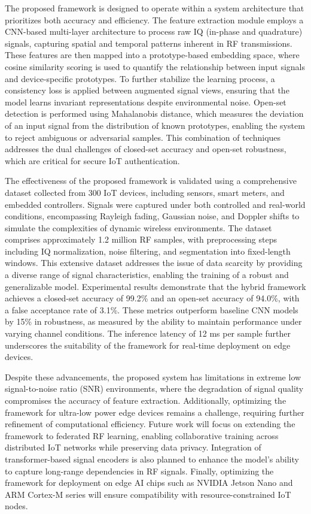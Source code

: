 \documentclass[conference]{IEEEtran}
\begin{document}
The proposed framework is designed to operate within a system architecture that prioritizes both accuracy and efficiency. The feature extraction module employs a CNN-based multi-layer architecture to process raw IQ (in-phase and quadrature) signals, capturing spatial and temporal patterns inherent in RF transmissions. These features are then mapped into a prototype-based embedding space, where cosine similarity scoring is used to quantify the relationship between input signals and device-specific prototypes. To further stabilize the learning process, a consistency loss is applied between augmented signal views, ensuring that the model learns invariant representations despite environmental noise. Open-set detection is performed using Mahalanobis distance, which measures the deviation of an input signal from the distribution of known prototypes, enabling the system to reject ambiguous or adversarial samples. This combination of techniques addresses the dual challenges of closed-set accuracy and open-set robustness, which are critical for secure IoT authentication.  

The effectiveness of the proposed framework is validated using a comprehensive dataset collected from 300 IoT devices, including sensors, smart meters, and embedded controllers. Signals were captured under both controlled and real-world conditions, encompassing Rayleigh fading, Gaussian noise, and Doppler shifts to simulate the complexities of dynamic wireless environments. The dataset comprises approximately 1.2 million RF samples, with preprocessing steps including IQ normalization, noise filtering, and segmentation into fixed-length windows. This extensive dataset addresses the issue of data scarcity by providing a diverse range of signal characteristics, enabling the training of a robust and generalizable model. Experimental results demonstrate that the hybrid framework achieves a closed-set accuracy of 99.2\% and an open-set accuracy of 94.0\%, with a false acceptance rate of 3.1\%. These metrics outperform baseline CNN models by 15\% in robustness, as measured by the ability to maintain performance under varying channel conditions. The inference latency of 12 ms per sample further underscores the suitability of the framework for real-time deployment on edge devices.  

Despite these advancements, the proposed system has limitations in extreme low signal-to-noise ratio (SNR) environments, where the degradation of signal quality compromises the accuracy of feature extraction. Additionally, optimizing the framework for ultra-low power edge devices remains a challenge, requiring further refinement of computational efficiency. Future work will focus on extending the framework to federated RF learning, enabling collaborative training across distributed IoT networks while preserving data privacy. Integration of transformer-based signal encoders is also planned to enhance the model's ability to capture long-range dependencies in RF signals. Finally, optimizing the framework for deployment on edge AI chips such as NVIDIA Jetson Nano and ARM Cortex-M series will ensure compatibility with resource-constrained IoT nodes.  
\end{document}
